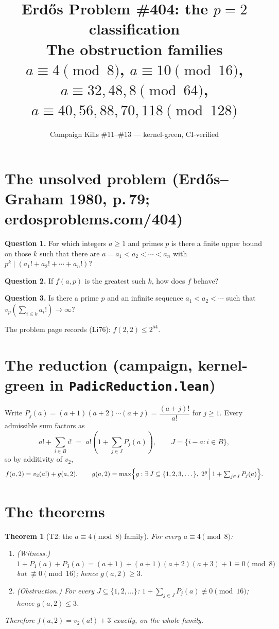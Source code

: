 \documentclass[11pt]{article}
\title{Erd\H{o}s Problem \#404: the $p=2$ classification\\ \large The obstruction families $a\equiv 4 \pmod 8$, $a\equiv 10 \pmod{16}$, $a\equiv 32,48,8 \pmod{64}$, $a\equiv 40,56,88,70,118 \pmod{128}$}
\date{Campaign Kills \#11--\#13 --- kernel-green, CI-verified}
\newtheorem{theorem}{Theorem}
\newcommand{\vtwo}{v_2}
\begin{document}
\maketitle

\section*{The unsolved problem (Erd\H{o}s--Graham 1980, p.\,79; erdosproblems.com/404)}

\textbf{Question 1.} For which integers $a \ge 1$ and primes $p$ is there a
finite upper bound on those $k$ such that there are
$a = a_1 < a_2 < \cdots < a_n$ with $p^k \mid (a_1! + a_2! + \cdots + a_n!)$?

\textbf{Question 2.} If $f(a,p)$ is the greatest such $k$, how does $f$ behave?

\textbf{Question 3.} Is there a prime $p$ and an infinite sequence
$a_1 < a_2 < \cdots$ such that $v_p\!\left(\sum_{i \le k} a_i!\right) \to \infty$?

The problem page records (Li76): $f(2,2) \le 2^{54}$.

\section*{The reduction (campaign, kernel-green in \texttt{PadicReduction.lean})}

Write $P_j(a) = (a+1)(a+2)\cdots(a+j) = \dfrac{(a+j)!}{a!}$ for $j \ge 1$.
Every admissible sum factors as
\[
a! + \sum_{i \in B} i! \;=\; a! \left( 1 + \sum_{j \in J} P_j(a) \right),
\qquad J = \{i - a : i \in B\},
\]
so by additivity of $\vtwo$,
\begin{equation}
f(a,2) = \vtwo(a!) + g(a,2), \qquad
g(a,2) = \max\Bigl\{ g : \exists\, J \subseteq \{1,2,3,\dots\},\;
2^g \,\Big|\, 1 + \textstyle\sum_{j \in J} P_j(a) \Bigr\}.
\label{eq:reduction}
\end{equation}

\section*{The theorems}

\begin{theorem}[T2: the $a \equiv 4 \pmod 8$ family]
For every $a \equiv 4 \pmod 8$:
\begin{enumerate}
\item[(i)] \emph{(Witness.)} $1 + P_1(a) + P_3(a) = (a+1) + (a+1)(a+2)(a+3) + 1
\equiv 0 \pmod 8$ but $\not\equiv 0 \pmod{16}$; hence $g(a,2) \ge 3$.
\item[(ii)] \emph{(Obstruction.)} For every $J \subseteq \{1,2,\dots\}$:
$1 + \sum_{j \in J} P_j(a) \not\equiv 0 \pmod{16}$; hence $g(a,2) \le 3$.
\end{enumerate}
Therefore $f(a,2) = \vtwo(a!) + 3$ exactly, on the whole family.
\end{theorem}
\end{document}
